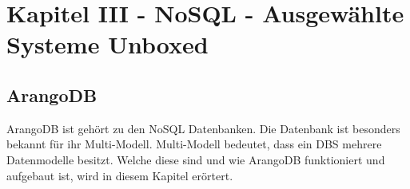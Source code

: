 \chapter{Kapitel III - NoSQL - Ausgewählte Systeme Unboxed}
\section{ArangoDB}
ArangoDB ist gehört zu den \ac{NoSQL} Datenbanken. Die Datenbank ist besonders bekannt für ihr Multi-Modell. Multi-Modell bedeutet, dass ein \ac{DBS} mehrere Datenmodelle besitzt. Welche diese sind und wie ArangoDB funktioniert und aufgebaut ist, wird in diesem Kapitel erörtert.



